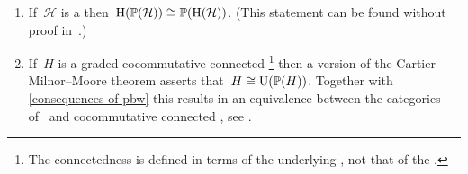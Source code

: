 \documentclass[a4paper,10pt,headings=standardclasses]{scrartcl}
\begin{document}
\begin{remark}
  \leavevmode
  \begin{enumerate}
    \item
      If~$\mathcal{H}$ is a {\dgh} then~$\operatorname{H}(\mathbb{P}(\mathcal{H})) \cong \mathbb{P}(\operatorname{H}(\mathcal{H}))$.
      (This statement can be found without proof in~\cite[Theorem~A.9]{loday}.)
    \item
      If~$H$ is a graded cocommutative connected%
      \footnote{The connectedness is defined in terms of the underlying {\dgc}, not that of the {\dga}.}
      {\dgh} then a version of the Cartier--Milnor--Moore theorem asserts that~$H \cong \operatorname{U}(\mathbb{P}(H))$.
      Together with \cref{consequences of pbw} this results in an equivalence between the categories of~{\dgls} and cocommutative connected {\dghs}, see \cite[Appendix~B,Theorem~4.5]{quillen}.
  \end{enumerate}
\end{remark}





\appendix






\end{document}
